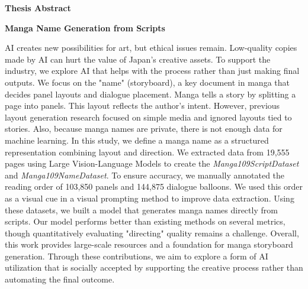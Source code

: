 \documentclass[a4j,10.5pt,dvipdfmx]{jsreport}
\begin{document}
\newpage %



\thispagestyle{empty}

\begin{center}
   \vspace*{5mm}

   {\huge \bfseries Thesis Abstract}

   \vspace{10mm} %

   {\Large \bfseries Manga Name Generation from Scripts}

   \vspace{15mm} %
\end{center}

AI creates new possibilities for art, but ethical issues remain. Low-quality copies made by AI can hurt the value of Japan's creative assets. To support the industry, we explore AI that helps with the process rather than just making final outputs. We focus on the "name" (storyboard), a key document in manga that decides panel layouts and dialogue placement.
Manga tells a story by splitting a page into panels. This layout reflects the author's intent. However, previous layout generation research focused on simple media and ignored layouts tied to stories. Also, because manga names are private, there is not enough data for machine learning.
In this study, we define a manga name as a structured representation combining layout and direction. We extracted data from 19,555 pages using Large Vision-Language Models to create the \textit{Manga109ScriptDataset} and \textit{Manga109NameDataset}. To ensure accuracy, we manually annotated the reading order of 103,850 panels and 144,875 dialogue balloons. We used this order as a visual cue in a visual prompting method to improve data extraction. Using these datasets, we built a model that generates manga names directly from scripts. Our model performs better than existing methods on several metrics, though quantitatively evaluating "directing" quality remains a challenge. Overall, this work provides large-scale resources and a foundation for manga storyboard generation. Through these contributions, we aim to explore a form of AI utilization that is socially accepted by supporting the creative process rather than automating the final outcome.

\ifdefined\ismain\else
   \printbibliography[title=参考文献]
\fi
\end{document}
